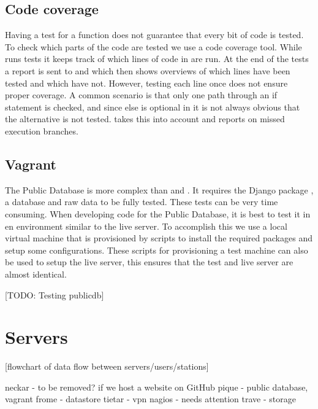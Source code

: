 \subsection{Code coverage}

Having a test for a function does not guarantee that every bit of code
is tested. To check which parts of the code are tested we use a code
coverage tool. While \travis runs tests it keeps track of which lines of
code in \sapphire are run. At the end of the tests a report is sent to
\coveralls \cite{coveralls} and \codecov \cite{codecov} which then shows overviews of which lines have been tested and which have not. However, testing each line once does not ensure proper coverage. A common scenario is that only one path through an if statement is checked, and since else is optional in \python it is not always obvious that the alternative is not tested. \codecov takes this into account and reports on missed execution branches.


\subsection{Vagrant}

The Public Database is more complex than \sapphire and \jsparc. It
requires the Django package \cite{django}, a database and raw data to be
fully tested. These tests can be very time consuming. When developing
code for the Public Database, it is best to test it in en environment
similar to the live server. To accomplish this we use a local virtual
machine that is provisioned by scripts to install the required packages
and setup some configurations. These scripts for provisioning a test
machine can also be used to setup the live server, this ensures that the
test and live server are almost identical.

[TODO: Testing publicdb]


\section{Servers}


[flowchart of data flow between servers/users/stations]

neckar - to be removed? if we host a website on GitHub
pique - public database, vagrant
frome - datastore
tietar - vpn nagios - needs attention
trave - storage
